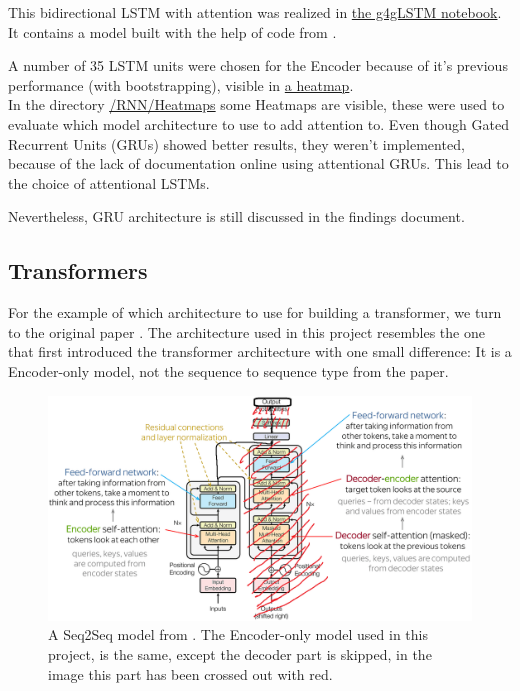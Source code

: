 \documentclass{article}
\begin{document}
This bidirectional LSTM with attention was realized in \href{https://github.com/AntonStantan/matura/blob/main/attentional-RNN/g4gLSTM.ipynb}
{the g4gLSTM notebook}. It contains a model built with the help of code from 
\cite{geeksforgeeks_attention_bilstm}. 

A number of 35 LSTM units were chosen for the Encoder because of it's previous 
performance (with bootstrapping), visible in \href{https://github.com/AntonStantan/matura/blob/main/attentional-RNN/previousHeatmap.png}
{a heatmap}.
\\[2em]
In the directory \href{https://github.com/AntonStantan/matura/tree/main/RNN/Heatmaps}
{/RNN/Heatmaps} some Heatmaps are visible, these were used to evaluate which 
model architecture to use to add attention to. Even though Gated Recurrent 
Units (GRUs) showed better results, they weren't implemented, because of the 
lack of documentation online using attentional GRUs. This lead to the choice 
of attentional LSTMs.

Nevertheless, GRU architecture is still discussed in the findings document.

\newpage
\subsection{Transformers}

For the example of which architecture to use for building a transformer, we 
turn to the original paper \cite{vaswani2023attentionneed}. The architecture 
used in this project resembles the one that first introduced the transformer 
architecture with one small difference: It is a Encoder-only model, not the 
sequence to sequence type from the paper.

\begin{figure}[htbp]
    \centering
    \includegraphics[width=0.5\paperwidth]{images/transformerSeq2Seq.png}
    \caption{A Seq2Seq model from \cite{vaswani2023attentionneed}. The 
    Encoder-only model used in this project, is the same, except the decoder 
    part is skipped, in the image this part has been crossed out with red.}
    \label{fig:transformerSeq2Seq}
\end{figure}
\end{document}

